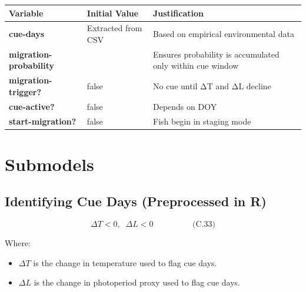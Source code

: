 \documentclass[
]{book}
\providecommand{\tightlist}{%
  \setlength{\itemsep}{0pt}\setlength{\parskip}{0pt}}
\begin{document}
\begin{longtable}[]{@{}
  >{\raggedright\arraybackslash}p{}
  >{\raggedright\arraybackslash}p{}
  >{\raggedright\arraybackslash}p{}@{}}
\toprule\noalign{}
\begin{minipage}[b]{\linewidth}\raggedright
Variable
\end{minipage} & \begin{minipage}[b]{\linewidth}\raggedright
Initial Value
\end{minipage} & \begin{minipage}[b]{\linewidth}\raggedright
Justification
\end{minipage} \\
\midrule\noalign{}
\endhead
\bottomrule\noalign{}
\endlastfoot
\textbf{cue-days} & Extracted from CSV & Based on empirical environmental data \\
\textbf{migration-probability} & 0 & Ensures probability is accumulated only within cue window \\
\textbf{migration-trigger?} & false & No cue until ΔT and ΔL decline \\
\textbf{cue-active?} & false & Depends on DOY \\
\textbf{start-migration?} & false & Fish begin in staging mode \\
\end{longtable}

\section{Submodels}\label{submodels-3}

\subsection{Identifying Cue Days (Preprocessed in R)}\label{identifying-cue-days-preprocessed-in-r}

\[
\begin{equation} \Delta T < 0, \;\; \Delta L < 0  \hspace{2cm} \text{(C.33)} \end{equation}
\]

Where:

\begin{itemize}
\tightlist
\item
  \(\Delta T\) is the change in temperature used to flag cue days.
\item
  \(\Delta L\) is the change in photoperiod proxy used to flag cue days.
\end{itemize}
\end{document}
